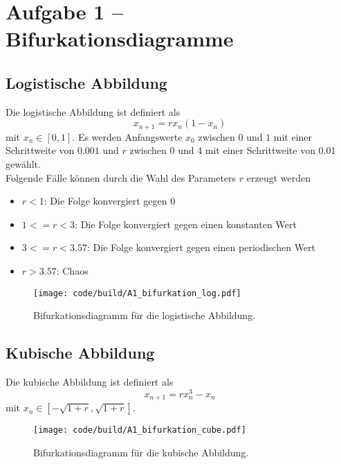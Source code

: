 \section{Aufgabe 1 – Bifurkationsdiagramme}
\label{sec:A1}
\subsection{Logistische Abbildung}
Die logistische Abbildung ist definiert als
\begin{equation}
    x_{n+1} = r x_n (1 - x_n)
\end{equation}
mit $x_n \in [0, 1]$.
Es werden Anfangswerte $x_0$ zwischen $0$ und $1$ mit einer Schrittweite von $0.001$ und $r$ zwischen $0$ und $4$ mit einer Schrittweite von $0.01$ gewählt.
\\
Folgende Fälle können durch die Wahl des Parameters $r$ erzeugt werden
\begin{itemize}
    \item $r < 1$: Die Folge konvergiert gegen $0$
    \item $1 <= r < 3$: Die Folge konvergiert gegen einen konstanten Wert
    \item $3 <= r < 3.57$: Die Folge konvergiert gegen einen periodischen Wert
    \item $r > 3.57$: Chaos
\end{itemize}

\begin{figure}
    \centering
    \texttt{[image: code/build/A1\_bifurkation\_log.pdf]}
    \caption{Bifurkationsdiagramm für die logistische Abbildung.}
    \label{fig:A1_bifurkation}
\end{figure}

\subsection{Kubische Abbildung}
Die kubische Abbildung ist definiert als
\begin{equation}
    x_{n+1} = r x_n^3 - x_n
\end{equation}
mit $x_n \in [-\sqrt{1+r}, \sqrt{1+r}]$.

\begin{figure}
    \centering
    \texttt{[image: code/build/A1\_bifurkation\_cube.pdf]}
    \caption{Bifurkationsdiagramm für die kubische Abbildung.}
    \label{fig:A1_kubisch}
\end{figure}
